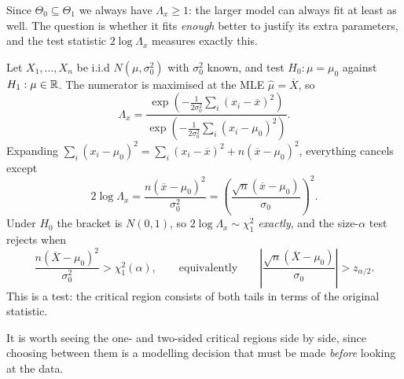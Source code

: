 \documentclass[a4paper]{scrartcl}
\begin{document}
Since $\Theta_0 \subseteq \Theta_1$ we always have $\Lambda_x \geq 1$: the larger model can always fit at least as well. The question is whether it fits \emph{enough} better to justify its extra parameters, and the test statistic $2\log\Lambda_x$ measures exactly this.

\begin{example}
  Let $X_1, \dots, X_n$ be i.i.d $N(\mu,\sigma_0^2)$ with $\sigma_0^2$ known, and test $H_0 : \mu = \mu_0$ against $H_1 : \mu \in \mathbb{R}$. The numerator is maximised at the MLE $\hat\mu = \overline{X}$, so
  $$
  \Lambda_x = \frac{\exp\left(-\frac{1}{2\sigma_0^2}\sum_i(x_i - \overline{x})^2\right)}{\exp\left(-\frac{1}{2\sigma_0^2}\sum_i(x_i-\mu_0)^2\right)}.
  $$
  Expanding $\sum_i (x_i - \mu_0)^2 = \sum_i (x_i - \overline{x})^2 + n(\overline{x}-\mu_0)^2$, everything cancels except
  $$
  2\log\Lambda_x = \frac{n\left(\overline{x}-\mu_0\right)^2}{\sigma_0^2} = \left(\frac{\sqrt{n}(\overline{x}-\mu_0)}{\sigma_0}\right)^2.
  $$
  Under $H_0$ the bracket is $N(0,1)$, so $2\log\Lambda_x \sim \chi^2_1$ \emph{exactly}, and the size-$\alpha$ test rejects when
  $$
  \frac{n(\overline{X}-\mu_0)^2}{\sigma_0^2} > \chi^2_1(\alpha), \qquad \text{equivalently} \qquad \left|\frac{\sqrt{n}(\overline{X}-\mu_0)}{\sigma_0}\right| > z_{\alpha/2}.
  $$
  This is a  test: the critical region consists of both tails in terms of the original statistic.
\end{example}

It is worth seeing the one- and two-sided critical regions side by side, since choosing between them is a modelling decision that must be made \emph{before} looking at the data.
\end{document}
